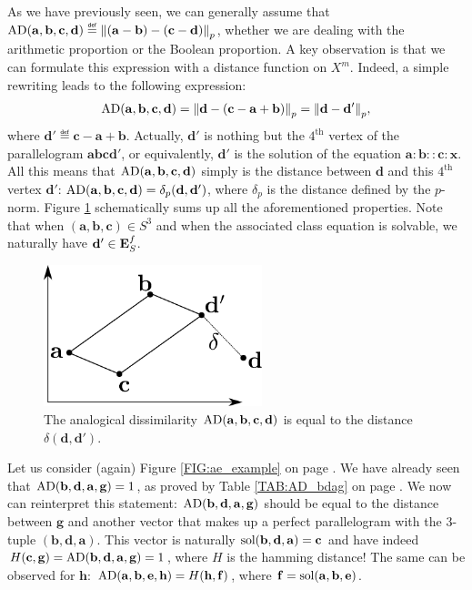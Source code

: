 As we have previously seen, we can generally assume that
$\AD(\mathbf{a},\mathbf{b},\mathbf{c},\mathbf{d}) \eqdef
\norm{p}{(\mathbf{a}-\mathbf{b})-(\mathbf{c}-\mathbf{d})}$, whether we are
dealing with the arithmetic proportion or the Boolean proportion.
A key observation is that we can formulate this expression with a distance
function on $X^m$. Indeed, a simple rewriting leads to the following expression:
$$\AD(\mathbf{a},\mathbf{b},\mathbf{c},\mathbf{d})=\norm{p}{\mathbf{d} -
(\mathbf{c}-\mathbf{a}+\mathbf{b})}=\norm{p}{\mathbf{d} - \mathbf{d}'},$$
where $\mathbf{d}'\eqdef\mathbf{c}-\mathbf{a}+\mathbf{b}$. Actually,
$\mathbf{d}'$ is nothing but the $4^\text{th}$ vertex of the parallelogram
$\mathbf{a}\mathbf{b}\mathbf{c}\mathbf{d}'$, or equivalently, $\mathbf{d}'$ is
the
solution of the equation $\mathbf{a}: \mathbf{b} :: \mathbf{c} : \mathbf{x}$.
All this means that $\AD(\mathbf{a},\mathbf{b},\mathbf{c},\mathbf{d})$ simply
is the distance between $\mathbf{d}$ and this $4^\text{th}$ vertex
$\mathbf{d}'$: $\AD(\mathbf{a},\mathbf{b},\mathbf{c},\mathbf{d}) =
\delta_p(\mathbf{d}, \mathbf{d}')$, where $\delta_p$ is the distance defined by
the $p$-norm. Figure \ref{FIG:analogical_dissimilarity} schematically sums up all the aforementioned
properties.  Note that when $(\mathbf{a}, \mathbf{b}, \mathbf{c}) \in S^3$ and
when the associated class equation is solvable, we naturally have $\mathbf{d}'
\in \esf$.
\begin{figure}[!h]
\centering
  \includegraphics[width=2.5in]{figures/analogical_dissimilarity.pdf}
  \caption{The analogical dissimilarity
  $\AD(\mathbf{a},\mathbf{b},\mathbf{c},\mathbf{d})$ is equal to the distance
  $\delta(\mathbf{d}, \mathbf{d}')$.}
\label{FIG:analogical_dissimilarity}
\end{figure}

\begin{testexample}
Let us consider (again) Figure \ref{FIG:ae_example} on page
\pageref{FIG:ae_example2}. We have already seen that $\AD(\mathbf{b},
\mathbf{d}, \mathbf{a}, \mathbf{g}) = 1$, as proved by Table \ref{TAB:AD_bdag}
  on page \pageref{TAB:AD_bdag}.
We now can reinterpret this statement: $\AD(\mathbf{b}, \mathbf{d}, \mathbf{a},
\mathbf{g})$ should be equal to the distance between $\mathbf{g}$ and another
vector that makes up a perfect parallelogram with the $3$-tuple
$(\mathbf{b},\mathbf{d}, \mathbf{a})$. This vector is naturally
$\sol(\mathbf{b},\mathbf{d}, \mathbf{a}) = \mathbf{c}$ and have indeed
$H(\mathbf{c}, \mathbf{g}) =  \AD(\mathbf{b}, \mathbf{d}, \mathbf{a},
\mathbf{g}) = 1$, where $H$ is the hamming distance! The same can be observed
for $\mathbf{h}$: $\AD(\mathbf{a}, \mathbf{b}, \mathbf{e}, \mathbf{h}) =
H(\mathbf{h}, \mathbf{f})$, where $\mathbf{f} = \sol(\mathbf{a}, \mathbf{b},
\mathbf{e})$.
\end{testexample}

